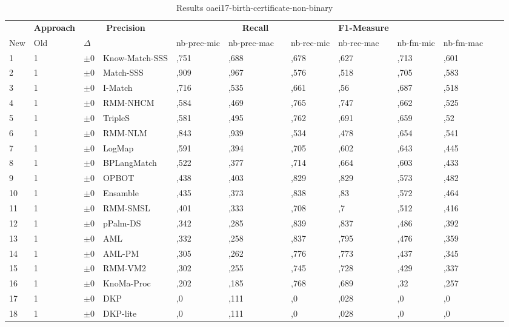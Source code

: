 \begin{table}[htb]
\setlength{\tabcolsep}{0.5em}
\centering
\scriptsize
\begin{tabular}[tb]{lllp{2.3cm}llllllllll}
\noalign{\smallskip}\hline\noalign{\smallskip}
\multicolumn{3}{c}{\textbf{Rank}}& \textbf{Approach}  & \multicolumn{2}{c}{\textbf{Precision}}  & \hspace*{1mm}  & \multicolumn{2}{c}{\textbf{Recall}}  & \hspace*{1mm}  & \multicolumn{2}{c}{\textbf{F1-Measure}}  & \hspace*{1mm} \\
New & Old & $\Delta$ & &nb-prec-mic & nb-prec-mac && nb-rec-mic & nb-rec-mac && nb-fm-mic & nb-fm-mac\\
\noalign{\smallskip}\hline\noalign{\smallskip}
1 & 1 		& $\pm$0 &Know-Match-SSS    	&	,751 & ,688 & & ,678 & ,627 & & ,713 & ,601\\
2 & 1 		& $\pm$0 &Match-SSS    	&	,909 & ,967 & & ,576 & ,518 & & ,705 & ,583\\
3 & 1 		& $\pm$0 &I-Match    	&	,716 & ,535 & & ,661 & ,56 & & ,687 & ,518\\
4 & 1 		& $\pm$0 &RMM-NHCM    	&	,584 & ,469 & & ,765 & ,747 & & ,662 & ,525\\
5 & 1 		& $\pm$0 &TripleS    	&	,581 & ,495 & & ,762 & ,691 & & ,659 & ,52\\
6 & 1 		& $\pm$0 &RMM-NLM    	&	,843 & ,939 & & ,534 & ,478 & & ,654 & ,541\\
7 & 1 		& $\pm$0 &LogMap    	&	,591 & ,394 & & ,705 & ,602 & & ,643 & ,445\\
8 & 1 		& $\pm$0 &BPLangMatch    	&	,522 & ,377 & & ,714 & ,664 & & ,603 & ,433\\
9 & 1 		& $\pm$0 &OPBOT    	&	,438 & ,403 & & ,829 & ,829 & & ,573 & ,482\\
10 & 1 		& $\pm$0 &Ensamble    	&	,435 & ,373 & & ,838 & ,83 & & ,572 & ,464\\
11 & 1 		& $\pm$0 &RMM-SMSL    	&	,401 & ,333 & & ,708 & ,7 & & ,512 & ,416\\
12 & 1 		& $\pm$0 &pPalm-DS    	&	,342 & ,285 & & ,839 & ,837 & & ,486 & ,392\\
13 & 1 		& $\pm$0 &AML    	&	,332 & ,258 & & ,837 & ,795 & & ,476 & ,359\\
14 & 1 		& $\pm$0 &AML-PM    	&	,305 & ,262 & & ,776 & ,773 & & ,437 & ,345\\
15 & 1 		& $\pm$0 &RMM-VM2    	&	,302 & ,255 & & ,745 & ,728 & & ,429 & ,337\\
16 & 1 		& $\pm$0 &KnoMa-Proc    	&	,202 & ,185 & & ,768 & ,689 & & ,32 & ,257\\
17 & 1 		& $\pm$0 &DKP    	&	,0 & ,111 & & ,0 & ,028 & & ,0 & ,0\\
18 & 1 		& $\pm$0 &DKP-lite    	&	,0 & ,111 & & ,0 & ,028 & & ,0 & ,0\\
\end{tabular}
\caption{Results oaei17-birth-certificate-non-binary}
\label{tbl:results}
\end{table}